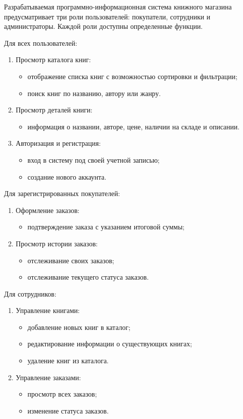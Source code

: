 Разрабатываемая программно-информационная система книжного магазина предусматривает три роли пользователей: покупатели, сотрудники и администраторы. Каждой роли доступны определенные функции.

Для всех пользователей:

\begin{enumerate}
	\item Просмотр каталога книг:
	\begin{itemize}
		\item отображение списка книг с возможностью сортировки и фильтрации;
		\item поиск книг по названию, автору или жанру.
	\end{itemize}
	\item Просмотр деталей книги:
	\begin{itemize}
		\item информация о названии, авторе, цене, наличии на складе и описании.
	\end{itemize}
	\item Авторизация и регистрация:
	\begin{itemize}
		\item вход в систему под своей учетной записью;
		\item создание нового аккаунта.
	\end{itemize}
\end{enumerate}

Для зарегистрированных покупателей:
\begin{enumerate}
	\item Оформление заказов:
	\begin{itemize}
		\item подтверждение заказа с указанием итоговой суммы;
	\end{itemize}
	\item Просмотр истории заказов:
	\begin{itemize}
		\item отслеживание своих заказов;
		\item отслеживание текущего статуса заказов.
	\end{itemize}
\end{enumerate}

Для сотрудников:
\begin{enumerate}
	\item Управление книгами:
	\begin{itemize}
		\item добавление новых книг в каталог;
		\item редактирование информации о существующих книгах;
		\item удаление книг из каталога.
	\end{itemize}
	\item Управление заказами:
	\begin{itemize}
		\item просмотр всех заказов;
		\item изменение статуса заказов.
	\end{itemize}
\end{enumerate}


